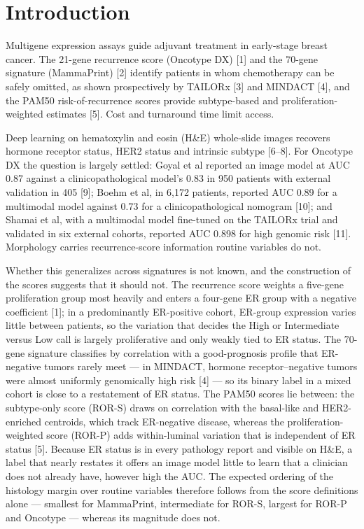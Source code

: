 \documentclass[11pt,a4paper]{article}
\begin{document}
\section{Introduction}
Multigene expression assays guide adjuvant treatment in early-stage breast cancer. The 21-gene recurrence score (Oncotype DX) [1] and the 70-gene signature (MammaPrint) [2] identify patients in whom chemotherapy can be safely omitted, as shown prospectively by TAILORx [3] and MINDACT [4], and the PAM50 risk-of-recurrence scores provide subtype-based and proliferation-weighted estimates [5]. Cost and turnaround time limit access.

Deep learning on hematoxylin and eosin (H\&E) whole-slide images recovers hormone receptor status, HER2 status and intrinsic subtype [6--8]. For Oncotype DX the question is largely settled: Goyal et al reported an image model at AUC 0.87 against a clinicopathological model's 0.83 in 950 patients with external validation in 405 [9]; Boehm et al, in 6,172 patients, reported AUC 0.89 for a multimodal model against 0.73 for a clinicopathological nomogram [10]; and Shamai et al, with a multimodal model fine-tuned on the TAILORx trial and validated in six external cohorts, reported AUC 0.898 for high genomic risk [11]. Morphology carries recurrence-score information routine variables do not.

Whether this generalizes across signatures is not known, and the construction of the scores suggests that it should not. The recurrence score weights a five-gene proliferation group most heavily and enters a four-gene ER group with a negative coefficient [1]; in a predominantly ER-positive cohort, ER-group expression varies little between patients, so the variation that decides the High or Intermediate versus Low call is largely proliferative and only weakly tied to ER status. The 70-gene signature classifies by correlation with a good-prognosis profile that ER-negative tumors rarely meet --- in MINDACT, hormone receptor--negative tumors were almost uniformly genomically high risk [4] --- so its binary label in a mixed cohort is close to a restatement of ER status. The PAM50 scores lie between: the subtype-only score (ROR-S) draws on correlation with the basal-like and HER2-enriched centroids, which track ER-negative disease, whereas the proliferation-weighted score (ROR-P) adds within-luminal variation that is independent of ER status [5]. Because ER status is in every pathology report and visible on H\&E, a label that nearly restates it offers an image model little to learn that a clinician does not already have, however high the AUC. The expected ordering of the histology margin over routine variables therefore follows from the score definitions alone --- smallest for MammaPrint, intermediate for ROR-S, largest for ROR-P and Oncotype --- whereas its magnitude does not.
\end{document}
